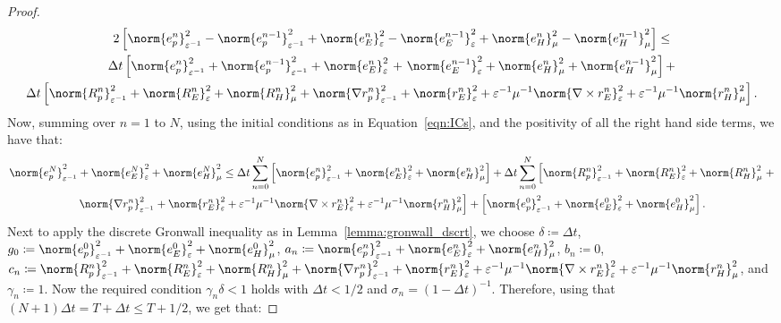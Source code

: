 \documentclass{amsart}
\theoremstyle{thmstyleone}%
\theoremstyle{thmstyletwo}%
\theoremstyle{thmstylethree}%
\begin{document}
\begin{proof}
\begin{multline*}
  2 \left[ \norm{e_p^n}^2_{\varepsilon^{-1}} - \norm{e_p^{n - 1}}^2_{\varepsilon^{-1}} + \norm{e_E^n}^2_{\varepsilon} - \norm{e_E^{n - 1}}^2_{\varepsilon} + \norm{e_H^n}^2_{\mu} - \norm{e_H^{n - 1}}^2_{\mu} \right] \le \\ \Delta t \left[ \norm{e_p^n}^2_{\varepsilon^{-1}} + \norm{e_p^{n - 1}}^2_{\varepsilon^{-1}} +  \norm{e_E^n}^2_{\varepsilon} \right. + \left. \norm{e_E^{n - 1}}^2_{\varepsilon} + \norm{e_H^n}^2_{\mu} + \norm{e_H^{n - 1}}^2_{\mu} \right] + \\
  \Delta t \left[\norm{R_p^n} ^2_{\varepsilon^{-1}} + \norm{R_E^n}^2_{\varepsilon} +  \norm{R_H^n}^2_{\mu} + \norm{\nabla r_p^n} ^2_{\varepsilon^{-1}} + \norm{r_E^n}^2_{\varepsilon} + \varepsilon^{-1} \mu^{-1} \norm{\nabla \times r_E^n}^2_{\varepsilon} +  \varepsilon^{-1} \mu^{-1} \norm{r_H^n}^2_{\mu} \right].
\end{multline*}
Now, summing over $n = 1$ to $N$, using the initial conditions as in Equation~\eqref{eqn:ICs}, and the positivity of all the right hand side terms, we have that:
\begin{multline*}
  \norm{e_p^N}^2_{\varepsilon^{-1}} + \norm{e_E^N}^2_{\varepsilon} + \norm{e_H^N}^2_{\mu} \le \Delta t \sum\limits_{n = 0}^{N} \left[ \norm{e_p^n}^2_{\varepsilon^{-1}} +\norm{e_E^n}^2_{\varepsilon} + \norm{e_H^n}^2_{\mu} \right] + \Delta t \sum\limits_{n = 0}^{N} \left[\norm{R_p^n}^2_{\varepsilon^{-1}} + \norm{R_E^n}^2_{\varepsilon} + \norm{R_H^n}^2_{\mu} \right. + \\ \left. \norm{\nabla r_p^n} ^2_{\varepsilon^{-1}} + \norm{r_E^n}^2_{\varepsilon} + \varepsilon^{-1} \mu^{-1} \norm{\nabla \times r_E^n}^2_{\varepsilon} +  \varepsilon^{-1} \mu^{-1} \norm{r_H^n}^2_{\mu}\right] + \left[ \norm{e_p^0}^2_{\varepsilon^{-1}} + \norm{e_E^0}^2_{\varepsilon} + \norm{e_H^0}^2_{\mu} \right].
\end{multline*}
Next to apply the discrete Gronwall inequality as in Lemma~\ref{lemma:gronwall_dscrt}, we choose $\delta \coloneq \Delta t$, $g_0 \coloneq \norm{e_p^0}^2_{\varepsilon^{-1}} + \norm{e_E^0}^2_{\varepsilon} + \norm{e_H^0}^2_{\mu}$, $a_n \coloneq \norm{e_p^n}^2_{\varepsilon^{-1}} + \norm{e_E^n}^2_{\varepsilon} + \norm{e_H^n}^2_{\mu}$, $b_n \coloneq 0$, $c_n \coloneq \norm{R_p^n}^2_{\varepsilon^{-1}} + \norm{R_E^n}^2_{\varepsilon} + \norm{R_H^n}^2_{\mu} + \norm{\nabla r_p^n} ^2_{\varepsilon^{-1}} + \norm{r_E^n}^2_{\varepsilon} + \varepsilon^{-1} \mu^{-1} \norm{\nabla \times r_E^n}^2_{\varepsilon} +  \varepsilon^{-1} \mu^{-1} \norm{r_H^n}^2_{\mu}$, and $\gamma_n \coloneq 1$. Now the required condition $\gamma_n \delta < 1$ holds with $\Delta t < 1/2$ and $\sigma_n = \left( 1 - \Delta t \right)^{-1}$. Therefore, using that $(N + 1) \Delta t = T + \Delta t \le T + 1/2$, we get that:

\end{proof}
\end{document}
